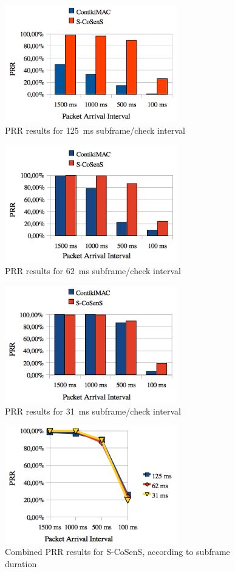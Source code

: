 \documentclass[conference]{IEEEtran}
\begin{document}
\begin{figure}[tbph]
  \centering
  \includegraphics[width=7.5cm]{graphes/PRR8Hz.png}
  \caption{PRR results for 125~ms subframe/check interval}
  \label{FigSuccessRate8Hz}
\end{figure}
\begin{figure}[tbph]
  \centering
  \includegraphics[width=7.5cm]{graphes/PRR16Hz.png}
  \caption{PRR results for 62~ms subframe/check interval}
  \label{FigSuccessRate16Hz}
\end{figure}
\begin{figure}[tbph]
  \centering
  \includegraphics[width=7.5cm]{graphes/PRR32Hz.png}
  \caption{PRR results for 31~ms subframe/check interval}
  \label{FigSuccessRate32Hz}
\end{figure}
\begin{figure}[tbph]
  \centering
  \includegraphics[width=7.5cm]{graphes/PRRstabilitySCoSenS.png}
  \caption{Combined PRR results for S-CoSenS,
           according to subframe duration}
  \label{FigSuccessRateSCoSenS}
\end{figure}
\end{document}
